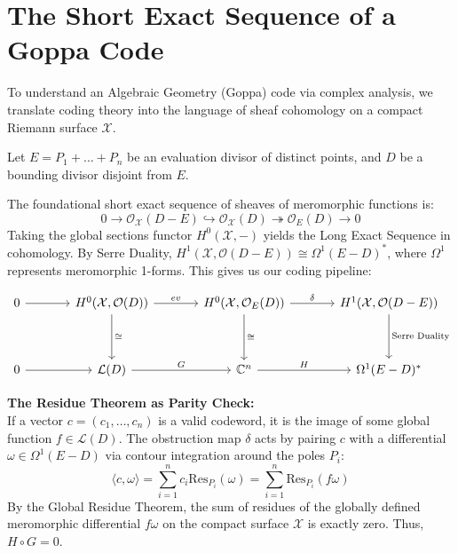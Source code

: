 \documentclass[11pt, a4paper, twoside]{article}
\newcommand{\C}{\mathbb{C}}
\newcommand{\X}{\mathcal{X}}
\newcommand{\cO}{\mathcal{O}}
\begin{document}
	
	\section*{The Short Exact Sequence of a Goppa Code}
	
	To understand an Algebraic Geometry (Goppa) code via complex analysis, we translate coding theory into the language of sheaf cohomology on a compact Riemann surface $\X$. 
	
	Let $E = P_1 + \dots + P_n$ be an evaluation divisor of distinct points, and $D$ be a bounding divisor disjoint from $E$.
	
	\begin{theorybox}
		The foundational short exact sequence of sheaves of meromorphic functions is:
		$$ 0 \to \cO_{\X}(D - E) \hookrightarrow \cO_{\X}(D) \twoheadrightarrow \cO_E(D) \to 0 $$
		Taking the global sections functor $H^0(\X, -)$ yields the Long Exact Sequence in cohomology. By Serre Duality, $H^1(\X, \cO(D-E)) \cong \Omega^1(E-D)^*$, where $\Omega^1$ represents meromorphic 1-forms. This gives us our coding pipeline:
		
		\[
		\begin{tikzcd}[row sep=huge, column sep=large]
			0 \arrow[r] & 
			H^0(\X, \cO(D)) \arrow[r, "ev"] \arrow[d, "\cong"] & 
			H^0(\X, \cO_E(D)) \arrow[r, "\delta"] \arrow[d, "\cong"] & 
			H^1(\X, \cO(D-E)) \arrow[d, "\text{Serre Duality}"] \\
			0 \arrow[r] & 
			\mathcal{L}(D) \arrow[r, "G"] & 
			\C^n \arrow[r, "H"] & 
			\Omega^1(E-D)^*
		\end{tikzcd}
		\]
		
		\textbf{The Residue Theorem as Parity Check:}\\
		If a vector $c = (c_1, \dots, c_n)$ is a valid codeword, it is the image of some global function $f \in \mathcal{L}(D)$. The obstruction map $\delta$ acts by pairing $c$ with a differential $\omega \in \Omega^1(E-D)$ via contour integration around the poles $P_i$:
		$$ \langle c, \omega \rangle = \sum_{i=1}^n c_i \text{Res}_{P_i}(\omega) = \sum_{i=1}^n \text{Res}_{P_i}(f\omega) $$
		By the Global Residue Theorem, the sum of residues of the globally defined meromorphic differential $f\omega$ on the compact surface $\X$ is exactly zero. Thus, $H \circ G = 0$.
	\end{theorybox}
	
	\vspace{1em}
	
\end{document}
